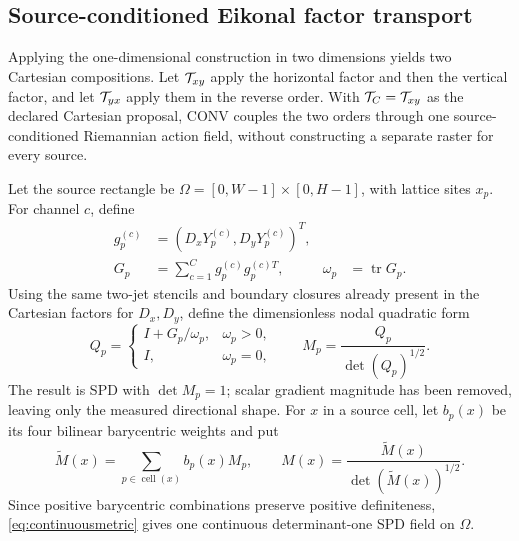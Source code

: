 \subsection{Source-conditioned Eikonal factor transport}
\label{sec:witnessedtransport}

Applying the one-dimensional construction in two dimensions yields two
Cartesian compositions. Let \(\mathcal{T}_{xy}\) apply the horizontal factor and
then the vertical factor, and let \(\mathcal{T}_{yx}\) apply them in the reverse
order. With \(\mathcal{T}_C=\mathcal{T}_{xy}\) as the declared Cartesian proposal, CONV
couples the two orders through one source-conditioned Riemannian action field,
without constructing a separate raster for every source.

Let the source rectangle be
\(\Omega=[0,W-1]\times[0,H-1]\), with lattice sites \(x_p\). For channel
\(c\), define
\begin{equation}
 \begin{aligned}
 g_p^{(c)}&=(D_xY_p^{(c)},D_yY_p^{(c)})^T,\\
 G_p&=\sum_{c=1}^Cg_p^{(c)}g_p^{(c)T},
 &\omega_p&=\operatorname{tr}G_p .
 \end{aligned}
 \label{eq:witnessjet}
\end{equation}
Using the same two-jet stencils and boundary closures already present in the
Cartesian factors for \(D_x,D_y\), define the dimensionless nodal quadratic
form
\begin{equation}
 Q_p=
 \begin{cases}
 I+G_p/\omega_p,&\omega_p>0,\\
 I,&\omega_p=0,
 \end{cases}
 \qquad
 M_p=\frac{Q_p}{\det(Q_p)^{1/2}}.
 \label{eq:nodalmetric}
\end{equation}
The result is SPD with \(\det M_p=1\); scalar gradient magnitude has been
removed, leaving only the measured directional shape. For \(x\) in a source
cell, let \(b_p(x)\) be its four bilinear barycentric weights and put
\begin{equation}
 \widetilde M(x)=\sum_{p\in\operatorname{cell}(x)}b_p(x)M_p,
 \qquad
 M(x)=\frac{\widetilde M(x)}{\det(\widetilde M(x))^{1/2}}.
 \label{eq:continuousmetric}
\end{equation}
Since positive barycentric combinations preserve positive definiteness,
\eqref{eq:continuousmetric} gives one continuous determinant-one SPD field on
\(\Omega\).

